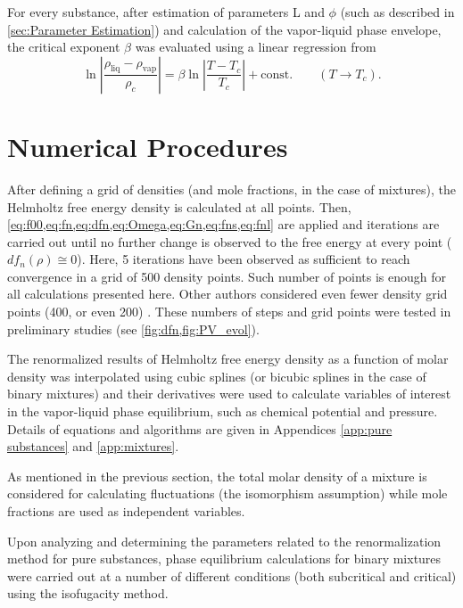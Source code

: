 \documentclass[preprint,12pt,3p]{elsarticle}
\begin{document}
For every substance, after estimation of parameters L and $\phi$ (such as described in \cref{sec:Parameter Estimation}) and calculation of the vapor-liquid phase envelope, the critical exponent $\beta$ was evaluated using a linear regression from
\begin{equation} \label{eq:beta_law}
\ln\left|\frac{\rho_\text{liq}-\rho_\text{vap}}{\rho_{c}}\right| = \beta \ln\left|\frac{T-T_{c}}{T_{c}}\right|+\text{const.} \qquad (T \rightarrow T_{c}).
\end{equation}

\section{Numerical Procedures}

After defining a grid of densities (and mole fractions, in the case of mixtures), the Helmholtz free energy density is calculated at all points.
Then, \cref{eq:f00,eq:fn,eq:dfn,eq:Omega,eq:Gn,eq:fns,eq:fnl} are applied and iterations are carried out until no further change is observed to the free energy at every point ($df_{n}(\rho) \cong 0$).
Here, 5 iterations have been observed as sufficient to reach convergence in a grid of 500 density points.
Such number of points is enough for all calculations presented here.
Other authors considered even fewer density grid points (400, or even 200) \cite{cai2004thermodynamics}.
These numbers of steps and grid points were tested in preliminary studies (see \cref{fig:dfn,fig:PV_evol}).

The renormalized results of Helmholtz free energy density as a function of molar density was interpolated using cubic splines (or bicubic splines in the case of binary mixtures) and their derivatives were used to calculate variables of interest in the vapor-liquid phase equilibrium, such as chemical potential and pressure.
Details of equations and algorithms are given in Appendices \ref{app:pure substances} and \ref{app:mixtures}.

As mentioned in the previous section, the total molar density of a mixture is considered for calculating fluctuations (the isomorphism assumption) while mole fractions are used as independent variables.

Upon analyzing and determining the parameters related to the renormalization method for pure substances, phase equilibrium calculations for binary mixtures were carried out at a number of different conditions (both subcritical and critical) using the isofugacity method.
\end{document}
